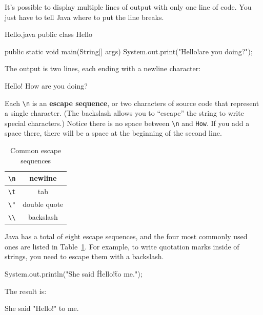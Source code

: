 It's possible to display multiple lines of output with only one line of code.
You just have to tell Java where to put the line breaks.

\begin{trinket}[220]{Hello.java}
public class Hello {

    public static void main(String[] args) {
        System.out.print("Hello!\nHow are you doing?\n");
    }
}
\end{trinket}

The output is two lines, each ending with a newline character:

\begin{stdout}
Hello!
How are you doing?
\end{stdout}


Each \verb"\n" is an {\bf escape sequence}, or two characters of source code that represent a single character.
(The backslash allows you to ``escape'' the string to write special characters.)
Notice there is no space between \verb"\n" and \verb"How".
If you add a space there, there will be a space at the beginning of the second line.

\begin{table}[!ht]
\begin{center}
\begin{tabular}{|c|c|}
\hline
\verb"\n" & newline \\
\hline
\verb"\t" & tab \\
\hline
\verb'\"' & double quote \\
\hline
\verb"\\" & backslash \\
\hline
\end{tabular}
\caption{Common escape sequences}
\label{tab:escape}
\end{center}
\end{table}


Java has a total of eight escape sequences, and the four most commonly used ones are listed in Table~\ref{tab:escape}.
For example, to write quotation marks inside of strings, you need to escape them with a backslash.

\begin{code}
System.out.println("She said \"Hello!\" to me.");
\end{code}

The result is:

\begin{stdout}
She said "Hello!" to me.
\end{stdout}


